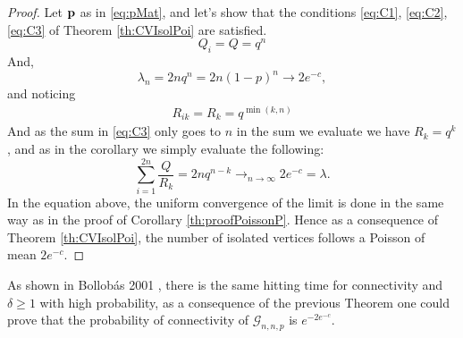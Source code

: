 \begin{proof}
	Let $\bold{p}$ as in \ref{eq:pMat}, and let's show that the conditions \eqref{eq:C1}, \eqref{eq:C2}, \eqref{eq:C3} of Theorem \ref{th:CVIsolPoi} are satisfied. 
	\begin{equation}
		Q_i = Q = q^{n}
	\end{equation}
	And,
	\begin{equation}
		\lambda_n = 2n q^{n}= 2n(1-p)^n \longrightarrow 2 e^{-c},
	\end{equation}
	and noticing 
	\begin{align}
		R_{ik} = R_k = q^{\min(k, n)}
	\end{align}
	And as the sum in \eqref{eq:C3} only goes to $n$ in the sum we evaluate we have $R_k = q^k$, and as in the corollary we simply evaluate the following:
	\begin{equation}
		\sum_{i=1}^{2n} \frac{Q}{R_k} =2n q^{n-k} \longrightarrow_{n\to\infty} 2e^{-c} = \lambda.
	\end{equation}
	In the equation above, the uniform convergence of the limit is done in the same way as in the proof of Corollary \ref{th:proofPoissonP}. 
	Hence as a consequence of Theorem \ref{th:CVIsolPoi}, the number of isolated vertices follows a Poisson of mean $2e^{-c}$.
\end{proof}
As shown in Bollob\'as 2001 \cite{Bollob01}, there is the same hitting time for connectivity and $\delta \geq 1$ with high probability, as a consequence of the previous Theorem one could prove that the probability of connectivity of $\mathcal{G}_{n,n, p}$ is $e^{-2e^{-c}}$. 


